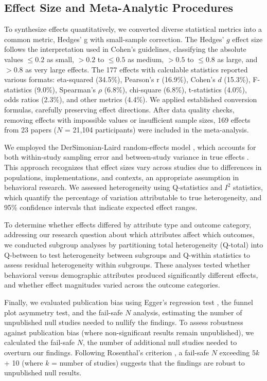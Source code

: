 \documentclass[sigconf,review,anonymous]{acmart}
\begin{document}
\subsection{Effect Size and Meta-Analytic Procedures}

To synthesize effects quantitatively, we converted diverse statistical metrics into a common metric, Hedges' g with small-sample correction. The Hedges' $g$ effect size follows the interpretation used in Cohen's \cite{cohen2013statistical} guidelines, classifying the absolute values $\leq0.2$ as small, $>0.2$ to $\leq0.5$ as medium, $>0.5$ to $\leq0.8$ as large, and $>0.8$ as very large effects. The 177 effects with calculable statistics reported various formats: eta-squared (34.5\%), Pearson's r (16.9\%), Cohen's $d$ (15.3\%), F-statistics (9.0\%), Spearman's $\rho$ (6.8\%), chi-square (6.8\%), t-statistics (4.0\%), odds ratios (2.3\%), and other metrics (4.4\%). We applied established conversion formulas, carefully preserving effect directions. After data quality checks, removing effects with impossible values or insufficient sample sizes, 169 effects from 23 papers ($N$ = 21,104 participants) were included in the meta-analysis.

We employed the DerSimonian-Laird random-effects model \citep{dersimonian1986meta}, which accounts for both within-study sampling error and between-study variance in true effects \cite{klein_effects_2025}. This approach recognizes that effect sizes vary across studies due to differences in populations, implementations, and contexts, an appropriate assumption in behavioral research. %
We assessed heterogeneity using Q-statistics and $I^2$ statistics, which quantify the percentage of variation attributable to true heterogeneity, and 95\% confidence intervals that indicate expected effect ranges. %

To determine whether effects differed by attribute type and outcome category, addressing our research question about which attributes affect which outcomes, we conducted subgroup analyses by partitioning total heterogeneity (Q-total) into Q-between to test heterogeneity between subgroups and Q-within statistics to assess residual heterogeneity within subgroups. These analyses tested whether behavioral versus demographic attributes produced significantly different effects, and whether effect magnitudes varied across the outcome categories. 

Finally, we evaluated publication bias using Egger's regression test \citep{egger1997bias}, the funnel plot asymmetry test, and the fail-safe $N$ analysis, estimating the number of unpublished null studies needed to nullify the findings. To assess robustness against publication bias (where non-significant results remain unpublished), we calculated the fail-safe $N$, the number of additional null studies needed to overturn our findings. Following Rosenthal's criterion \citep{rosenthal1979file}, a fail-safe $N$ exceeding $5k$ + 10 (where $k$ = number of studies) suggests that the findings are robust to unpublished null results.
\end{document}
